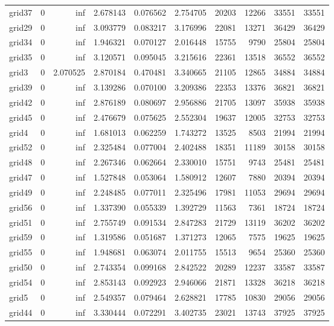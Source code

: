 \begin{longtable}{|l|r|r|r|r|r|r|r|r|r|}
grid37 & 0 & inf & 2.678143 & 0.076562 & 2.754705 & 20203 & 12266 & 33551 & 33551 \\
grid29 & 0 & inf & 3.093779 & 0.083217 & 3.176996 & 22081 & 13271 & 36429 & 36429 \\
grid34 & 0 & inf & 1.946321 & 0.070127 & 2.016448 & 15755 & 9790 & 25804 & 25804 \\
grid35 & 0 & inf & 3.120571 & 0.095045 & 3.215616 & 22361 & 13518 & 36552 & 36552 \\
grid3 & 0 & 2.070525 & 2.870184 & 0.470481 & 3.340665 & 21105 & 12865 & 34884 & 34884 \\
grid39 & 0 & inf & 3.139286 & 0.070100 & 3.209386 & 22353 & 13376 & 36821 & 36821 \\
grid42 & 0 & inf & 2.876189 & 0.080697 & 2.956886 & 21705 & 13097 & 35938 & 35938 \\
grid45 & 0 & inf & 2.476679 & 0.075625 & 2.552304 & 19637 & 12005 & 32753 & 32753 \\
grid4 & 0 & inf & 1.681013 & 0.062259 & 1.743272 & 13525 & 8503 & 21994 & 21994 \\
grid52 & 0 & inf & 2.325484 & 0.077004 & 2.402488 & 18351 & 11189 & 30158 & 30158 \\
grid48 & 0 & inf & 2.267346 & 0.062664 & 2.330010 & 15751 & 9743 & 25481 & 25481 \\
grid47 & 0 & inf & 1.527848 & 0.053064 & 1.580912 & 12607 & 7880 & 20394 & 20394 \\
grid49 & 0 & inf & 2.248485 & 0.077011 & 2.325496 & 17981 & 11053 & 29694 & 29694 \\
grid56 & 0 & inf & 1.337390 & 0.055339 & 1.392729 & 11563 & 7361 & 18724 & 18724 \\
grid51 & 0 & inf & 2.755749 & 0.091534 & 2.847283 & 21729 & 13119 & 36202 & 36202 \\
grid59 & 0 & inf & 1.319586 & 0.051687 & 1.371273 & 12065 & 7575 & 19625 & 19625 \\
grid55 & 0 & inf & 1.948681 & 0.063074 & 2.011755 & 15513 & 9654 & 25360 & 25360 \\
grid50 & 0 & inf & 2.743354 & 0.099168 & 2.842522 & 20289 & 12237 & 33587 & 33587 \\
grid54 & 0 & inf & 2.853143 & 0.092923 & 2.946066 & 21871 & 13328 & 36218 & 36218 \\
grid5 & 0 & inf & 2.549357 & 0.079464 & 2.628821 & 17785 & 10830 & 29056 & 29056 \\
grid44 & 0 & inf & 3.330444 & 0.072291 & 3.402735 & 23021 & 13743 & 37925 & 37925 \\

\end{longtable}
